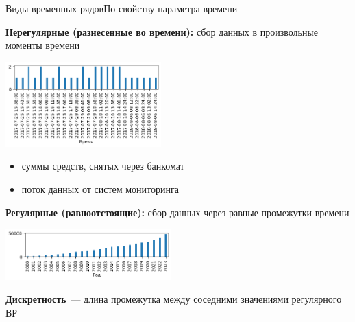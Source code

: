 \documentclass[10pt,pdf,utf8,hyperref={unicode},aspectratio=169]{beamer}
\begin{document}
\begin{frame}{Виды временных рядов}{По свойству параметра времени}
\begin{multicols}{2}
\textbf{Нерегулярные (разнесенные во времени):} сбор данных в произвольные моменты времени
	
	{\centering
	\includegraphics[width=0.45\textwidth]{fish.png}\par
	}

	\begin{itemize}
	\item суммы средств, снятых через банкомат
	\item поток данных от систем мониторинга
	\end{itemize}
	
	\columnbreak
	
	\textbf{Регулярные (равноотстоящие):} сбор данных через равные промежутки времени

	{\centering
		\includegraphics[width=0.48\textwidth]{wage_kirov.png}\par
	}
	
	\textbf{Дискретность}~--- длина промежутка между соседними значениями регулярного ВР
\end{multicols}
	
\end{frame}
\end{document}
